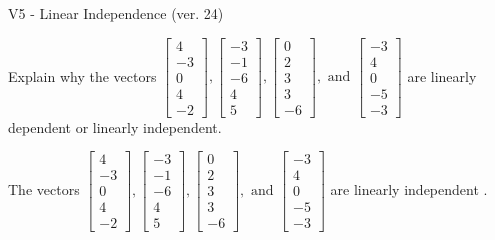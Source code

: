 \begin{exercise}
  \begin{exerciseTitle}V5 - Linear Independence (ver. 24)\end{exerciseTitle}
  \begin{exerciseStatement}
    Explain why the vectors \(\left[\begin{array}{r}
4 \\
-3 \\
0 \\
4 \\
-2
\end{array}\right] , \left[\begin{array}{r}
-3 \\
-1 \\
-6 \\
4 \\
5
\end{array}\right] , \left[\begin{array}{r}
0 \\
2 \\
3 \\
3 \\
-6
\end{array}\right] , \text{ and } \left[\begin{array}{r}
-3 \\
4 \\
0 \\
-5 \\
-3
\end{array}\right]\) are linearly dependent or linearly independent.	


  \end{exerciseStatement}
  \begin{exerciseAnswer}
   The vectors \(\left[\begin{array}{r}
4 \\
-3 \\
0 \\
4 \\
-2
\end{array}\right] , \left[\begin{array}{r}
-3 \\
-1 \\
-6 \\
4 \\
5
\end{array}\right] , \left[\begin{array}{r}
0 \\
2 \\
3 \\
3 \\
-6
\end{array}\right] , \text{ and } \left[\begin{array}{r}
-3 \\
4 \\
0 \\
-5 \\
-3
\end{array}\right]\) are 
  	 linearly independent  .
  


  \end{exerciseAnswer}
\end{exercise}